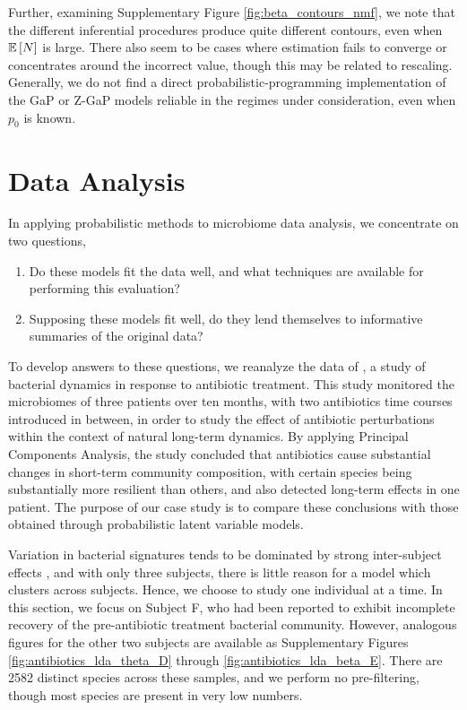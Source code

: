 \documentclass[oupdraft]{bio}
\begin{document}
Further, examining Supplementary Figure \ref{fig:beta_contours_nmf}, we note
that the different inferential procedures produce quite different contours, even
when $\mathbb{E}\left[{N}\right]$ is large. There also seem to be cases where estimation fails to
converge or concentrates around the incorrect value, though this may be related
to rescaling. Generally, we do not find a direct probabilistic-programming
implementation of the GaP or Z-GaP models reliable in the regimes under
consideration, even when $p_{0}$ is known.

\section{Data Analysis}
\label{sec:data_analysis}

In applying probabilistic methods to microbiome data analysis, we concentrate on
two questions,
\begin{enumerate}
\item Do these models fit the data well, and what techniques are available for
  performing this evaluation?
\item Supposing these models fit well, do they lend themselves to informative
summaries of the original data?
\end{enumerate}

To develop answers to these questions, we reanalyze the data of
\cite{dethlefsen2011incomplete}, a study of bacterial dynamics in response to
antibiotic treatment. This study monitored the microbiomes of three patients
over ten months, with two antibiotics time courses introduced in between, in
order to study the effect of antibiotic perturbations within the context of
natural long-term dynamics. By applying Principal Components Analysis, the study
concluded that antibiotics cause substantial changes in short-term community
composition, with certain species being substantially more resilient than
others, and also detected long-term effects in one patient. The purpose of our
case study is to compare these conclusions with those obtained through
probabilistic latent variable models.

Variation in bacterial signatures tends to be dominated by strong inter-subject
effects \citep{eckburg2005diversity}, and with only three subjects, there is
little reason for a model which clusters across subjects. Hence, we choose to
study one individual at a time. In this section, we focus on Subject F, who had
been reported to exhibit incomplete recovery of the pre-antibiotic treatment
bacterial community. However, analogous figures for the other two subjects are
available as Supplementary Figures \ref{fig:antibiotics_lda_theta_D} through
\ref{fig:antibiotics_lda_beta_E}. There are 2582 distinct species across these
samples, and we perform no pre-filtering, though most species are present in
very low numbers.
\end{document}
